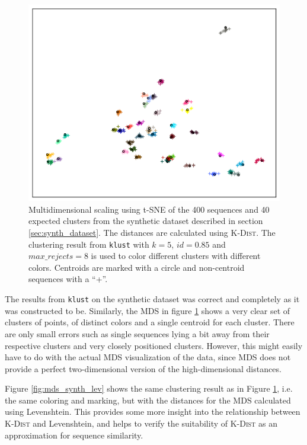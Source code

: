 \begin{figure}[h!]
  \includegraphics[width=\textwidth]{graphics/MDS_t-SNE_synth_silva_400.png}
  \caption{Multidimensional scaling using t-SNE of the 400 sequences and
    40 expected clusters from the synthetic dataset described in section
    \ref{sec:synth_dataset}. The distances are calculated using
    \textsc{K-Dist}. The clustering result from \texttt{klust} with $k=5$,
    $id=0.85$ and $max\_rejects=8$ is used to color different clusters with
    different colors. Centroids are marked with a circle and non-centroid
    sequences with a ``+''.}
  \label{fig:mds_synth}
\end{figure}

The results from \texttt{klust} on the synthetic dataset was correct and
completely as it was constructed to be. Similarly, the MDS in figure
\ref{fig:mds_synth} shows a very clear set of clusters of points, of distinct
colors and a single centroid for each cluster. There are only small
errors such as single sequences lying a bit away from their respective clusters
and very closely positioned clusters. However, this might easily have to do
with the actual MDS visualization of the data, since MDS does not provide a
perfect two-dimensional version of the high-dimensional distances.

Figure \ref{fig:mds_synth_lev} shows the same clustering result as in Figure
\ref{fig:mds_synth}, i.e. the same coloring and marking, but with the distances
for the MDS calculated using Levenshtein. This provides some more insight
into the relationship between \textsc{K-Dist} and Levenshtein, and helps to
verify the suitability of \textsc{K-Dist} as an approximation for sequence
similarity.

